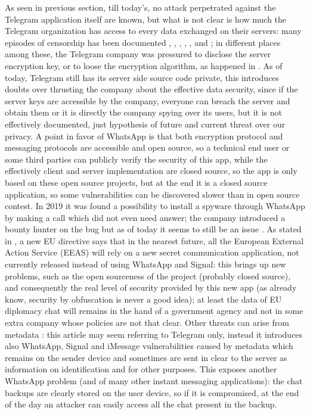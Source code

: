 \documentclass{article}
\begin{document}
As seen in previous section, till today's, no attack perpetrated against the Telegram application itself are known, but what is not clear is how much the Telegram organization has access to every data exchanged on their servers: many episodes of censorship has been documented \cite{china_cen}, \cite{honk_cen}, \cite{bahrain_cen}, \cite{pakistan_cen}, \cite{india_cen}, \cite{russia_cen} and \cite{iran_cen}; in different places among these, the Telegram company was pressured to disclose the server encryption key, or to loose the encryption algorithm, as happened in \cite{usa_weak}.\newline
As of today, Telegram still has its server side source code private, this introduces doubts over thrusting the company about the effective data security, since if the server keys are accessible by the company, everyone can breach the server and obtain them or it is directly the company spying over its users, but it is not effectively documented, just hypothesis of future and current threat over our privacy.\newline
A point in favor of WhatsApp is that both encryption protocol and messaging protocols are accessible and open source, so a technical end user or some third parties can publicly verify the security of this app, while the effectively client and server implementation are closed source, so the app is only based on these open source projects, but at the end it is a closed source application, so some vulnerabilities can be discovered slower than in open source contest.\newline
In 2019 it was found a possibility to install a spyware through WhatsApp by making a call which did not even need answer; the company introduced a bounty hunter on the bug but as of today it seems to still be an issue \cite{what_threat}.\newline
As stated in \cite{new_EU}, a new EU directive says that in the nearest future, all the European External Action Service (EEAS) will rely on a new secret communication application, not currently released instead of using WhatsApp and Signal: this brings up new problems, such as the open sourceness of the project (probably closed source), and consequently the real level of security provided by this new app (as already know, security by obfuscation is never a good idea); at least the data of EU diplomacy chat will remains in the hand of a government agency and not in some extra company whose policies are not that clear.\newline
Other threats can arise from metadata \cite{threat}: this article may seem referring to Telegram only, instead it introduces also WhatsApp, Signal and iMessage vulnerabilities caused by metadata which remains on the sender device and sometimes are sent in clear to the server as information on identification and for other purposes. This exposes another WhatsApp problem (and of many other instant messaging applications): the chat backups are clearly stored on the user device, so if it is compromised, at the end of the day an attacker can easily access all the chat present in the backup.\newline
\end{document}
